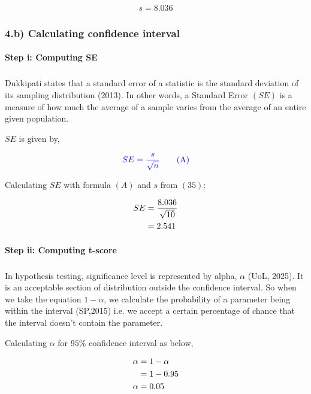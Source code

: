 \documentclass[a4paper]{report}
\begin{document}
\begin{align}
    \boxed{s=8.036}
\end{align}


\subsubsection*{4.b) Calculating confidence interval}

\paragraph{Step i: Computing SE}

\subparagraph*{}

Dukkipati states that a standard error of a statistic is the standard deviation of its sampling distribution (2013). In other words, a Standard Error $(SE)$ is a measure of how much the average of a sample varies from the average of an entire given population. 

$SE$ is given by,

\begin{equation*}
    \color{blue} SE=\frac{s}{\sqrt{n}} \tag{A}
\end{equation*}

Calculating $SE$ with formula $(A)$ and $s$ from $(35)$:

\begin{align}
    \notag SE &=\frac{8.036}{\sqrt{10}} \\
    &=2.541
\end{align}

\newpage
\paragraph{Step ii: Computing t-score}

\subparagraph*{}

In hypothesis testing, significance level is represented by alpha, $\alpha$ (UoL, 2025). It is an acceptable section of distribution outside the confidence interval. So when we take the equation $1-\alpha$, we calculate the probability of a parameter being within the interval (SP,2015) i.e. we accept a certain percentage of chance that the interval doesn't contain the parameter.

Calculating $\alpha$ for $95\%$ confidence interval as below,

\begin{align}
    \notag \alpha &= 1-\alpha \\ \notag &=1-0.95 \\ \alpha&=0.05
\end{align}
\end{document}
